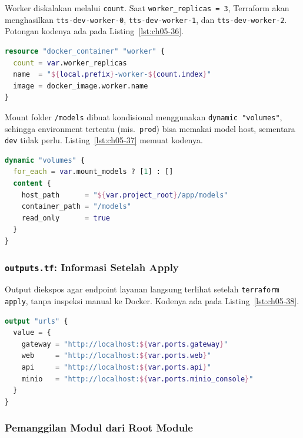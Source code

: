 Worker diskalakan melalui \texttt{count}. Saat \texttt{worker\_replicas = 3}, Terraform akan menghasilkan \texttt{tts-dev-worker-0}, \texttt{tts-dev-worker-1}, dan \texttt{tts-dev-worker-2}. Potongan kodenya ada pada Listing~\ref{lst:ch05-36}.

\begin{lstlisting}[language=terraform, caption={Potongan kode Terraform pada main.tf (5)}, label={lst:ch05-36}]
resource "docker_container" "worker" {
  count = var.worker_replicas
  name  = "${local.prefix}-worker-${count.index}"
  image = docker_image.worker.name
}
\end{lstlisting}

Mount folder \texttt{/models} dibuat kondisional menggunakan \texttt{dynamic "volumes"}, sehingga environment tertentu (mis.\ \texttt{prod}) bisa memakai model host, sementara \texttt{dev} tidak perlu. Listing~\ref{lst:ch05-37} memuat kodenya.

\begin{lstlisting}[language=terraform, caption={Potongan kode Terraform pada main.tf (6)}, label={lst:ch05-37}]
dynamic "volumes" {
  for_each = var.mount_models ? [1] : []
  content {
    host_path      = "${var.project_root}/app/models"
    container_path = "/models"
    read_only      = true
  }
}
\end{lstlisting}

\subsubsection{\texttt{outputs.tf}: Informasi Setelah Apply}

Output diekspos agar endpoint layanan langsung terlihat setelah \texttt{terraform apply}, tanpa inspeksi manual ke Docker. Kodenya ada pada Listing~\ref{lst:ch05-38}.

\begin{lstlisting}[language=terraform, caption={Potongan kode Terraform pada outputs.tf}, label={lst:ch05-38}]
output "urls" {
  value = {
    gateway = "http://localhost:${var.ports.gateway}"
    web     = "http://localhost:${var.ports.web}"
    api     = "http://localhost:${var.ports.api}"
    minio   = "http://localhost:${var.ports.minio_console}"
  }
}
\end{lstlisting}

\subsubsection{Pemanggilan Modul dari Root Module}

